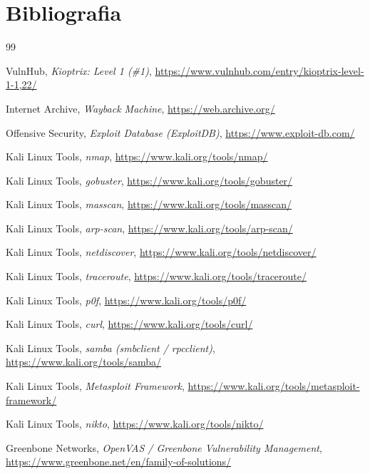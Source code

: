 \documentclass[12pt, a4paper]{article}
\begin{document}
	\newpage
	\section{Bibliografia}
	
	\begin{thebibliography}{99}
		
		VulnHub, \emph{Kioptrix: Level 1 (\#1)},
		\url{https://www.vulnhub.com/entry/kioptrix-level-1-1,22/}
		
		Internet Archive, \emph{Wayback Machine},
		\url{https://web.archive.org/}
		
		Offensive Security, \emph{Exploit Database (ExploitDB)},
		\url{https://www.exploit-db.com/}
		
		Kali Linux Tools, \emph{nmap},
		\url{https://www.kali.org/tools/nmap/}
		
		Kali Linux Tools, \emph{gobuster},
		\url{https://www.kali.org/tools/gobuster/}
		
		Kali Linux Tools, \emph{masscan},
		\url{https://www.kali.org/tools/masscan/}
		
		Kali Linux Tools, \emph{arp-scan},
		\url{https://www.kali.org/tools/arp-scan/}
		
		Kali Linux Tools, \emph{netdiscover},
		\url{https://www.kali.org/tools/netdiscover/}
		
		Kali Linux Tools, \emph{traceroute},
		\url{https://www.kali.org/tools/traceroute/}
		
		Kali Linux Tools, \emph{p0f},
		\url{https://www.kali.org/tools/p0f/}
		
		Kali Linux Tools, \emph{curl},
		\url{https://www.kali.org/tools/curl/}
		
		Kali Linux Tools, \emph{samba (smbclient / rpcclient)},
		\url{https://www.kali.org/tools/samba/}
		
		Kali Linux Tools, \emph{Metasploit Framework},
		\url{https://www.kali.org/tools/metasploit-framework/}
		
		Kali Linux Tools, \emph{nikto},
		\url{https://www.kali.org/tools/nikto/}
		
		Greenbone Networks, \emph{OpenVAS / Greenbone Vulnerability Management},
		\url{https://www.greenbone.net/en/family-of-solutions/}
		

\end{thebibliography}
\end{document}
